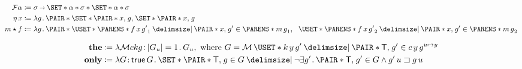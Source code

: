 \documentclass[10pt,fleqn]{article}
\begin{document}
\newpage

\begin{spreadlines}{0pt}
\begin{minipage}[t]{0.6\textwidth}
\begin{align*}
  \mathcal{F}\alpha
  &\coloneq
  \sigma \sto \typepair{%
    \set{\typepair{\alpha}{\sigma}}
  }{%
    \set{\typepair{\alpha}{\sigma}}
  } \\
  \eta\,x
  &\coloneq
  \l g \dt \pair{\set{\pair{x}{g}}}{\set{\pair{x}{g}}} \\
  m \bind f
  &\coloneq
  \l g \dt
    \thickpair{%
      \uset{\p{f\,x\,g'}_1 \giv \pair{x}{g'} \in \p{m\,g}_1}
    }{%
      \uset{\p{f\,x\,g'}_2 \giv \pair{x}{g'} \in \p{m\,g}_2}
    }
\end{align*}
\end{minipage}
\end{spreadlines}

\dotfill

\begin{minipage}[t]{0.6\textwidth}
\begin{align*}
  \textbf{the}
  &\coloneq
  \l \mathcal{M}ckg \col |G_u| = 1 \dt G_u,
  \ \text{where} \ 
  G = \mathcal{M}\,\uset{%
    k\,y\,g'
  \giv
    \pair{\cn{T}}{g'} \in c\,y\,g^{u\mapsto y}
  } \\
  \textbf{only}
  &\coloneq
  \l G \col \cn{true}\,G \dt
    \set{%
      \pair{\cn{T}}{g} \in G
    \giv
      \neg\exists g' \dt \pair{\cn{T}}{g'} \in G \land g'\,u \sqsupset g\,u
    }
\end{align*}
\end{minipage}
\end{document}
